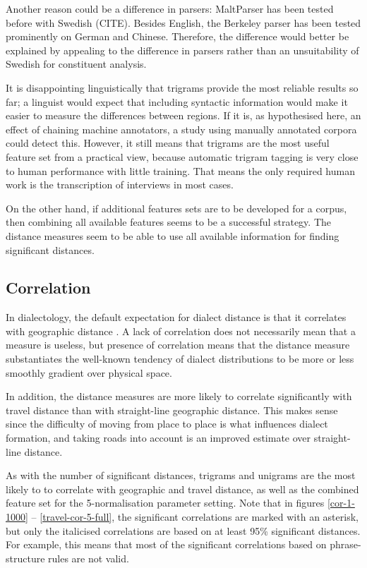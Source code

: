 Another reason could be a difference in parsers: MaltParser has been
tested before with Swedish (CITE). Besides English, the Berkeley
parser has been tested prominently on German and Chinese. Therefore,
the difference would better be explained by appealing to the
difference in parsers rather than an unsuitability of Swedish for
constituent analysis.

It is disappointing linguistically that trigrams provide the most
reliable results so far; a linguist would expect that including
syntactic information would make it easier to measure the differences
between regions. If it is, as hypothesised here, an effect of chaining
machine annotators, a study using manually annotated corpora could
detect this. However, it still means that trigrams are the most useful
feature set from a practical view, because automatic trigram tagging
is very close to human performance with little training. That means
the only required human work is the transcription of interviews in
most cases.

On the other hand, if additional features sets are to be developed for
a corpus, then combining all available features seems to be a
successful strategy. The distance measures seem to be able to use all
available information for finding significant distances.

\subsection{Correlation}

In dialectology, the default expectation for dialect distance is that
it correlates with geographic distance \cite{chambers98}. A lack of
correlation does not necessarily mean that a measure is useless, but
presence of correlation means that the distance measure substantiates the
well-known tendency of dialect distributions to be more or less
smoothly gradient over physical space.

In addition, the distance measures are more likely to correlate
significantly with travel distance than with straight-line geographic
distance. This makes sense since the difficulty of moving from place
to place is what influences dialect formation, and taking roads into
account is an improved estimate over straight-line distance.

As with the number of significant distances, trigrams and unigrams are
the most likely to to correlate with geographic and travel distance,
as well as the combined feature set for the 5-normalisation parameter
setting.
Note that in figures \ref{cor-1-1000} --
\ref{travel-cor-5-full}, the significant correlations are marked with
an asterisk, but only the italicised correlations are based on at
least 95\% significant distances. For example, this means that most of
the significant correlations based on phrase-structure rules are not valid.

